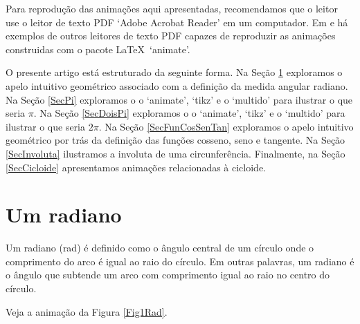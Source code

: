 \documentclass[10pt]{article}
\theoremstyle{plain} %
\theoremstyle{definition} %
\theoremstyle{remark} %
\begin{document}
Para reprodução das animações aqui apresentadas, recomendamos que o leitor use o leitor de texto PDF ‘Adobe Acrobat Reader’ em um computador. Em \cite{Bezerra} e \cite{Costa} há exemplos de outros leitores de texto PDF capazes de reproduzir as animações construidas com o pacote \LaTeX\ ‘animate'.

O presente artigo está estruturado da seguinte forma. Na Seção \ref{SecRadiano} exploramos o apelo intuitivo geométrico associado com a   definição da medida angular radiano. Na Seção \ref{SecPi} exploramos o o ‘animate', ‘tikz' e o ‘multido'  para ilustrar o que seria $\pi$. Na Seção \ref{SecDoisPi} exploramos o o ‘animate', ‘tikz' e o ‘multido'  para ilustrar o que seria $2\pi$.  Na Seção \ref{SecFunCosSenTan} exploramos  o apelo intuitivo geométrico por trás da definição das funções cosseno, seno e tangente. Na Seção \ref{SecInvoluta} ilustramos a involuta de uma circunferência. Finalmente, na Seção \ref{SecCicloide} apresentamos animações relacionadas à cicloide. 

\section{Um radiano}\label{SecRadiano}

\begin{definition}
Um radiano (rad) é definido como o ângulo central de um círculo onde o comprimento do arco é igual ao raio do círculo. Em outras palavras, um radiano é o ângulo que subtende um arco com comprimento igual ao raio no centro do círculo. 
\end{definition}


Veja a animação da Figura \ref{Fig1Rad}.
\end{document}
